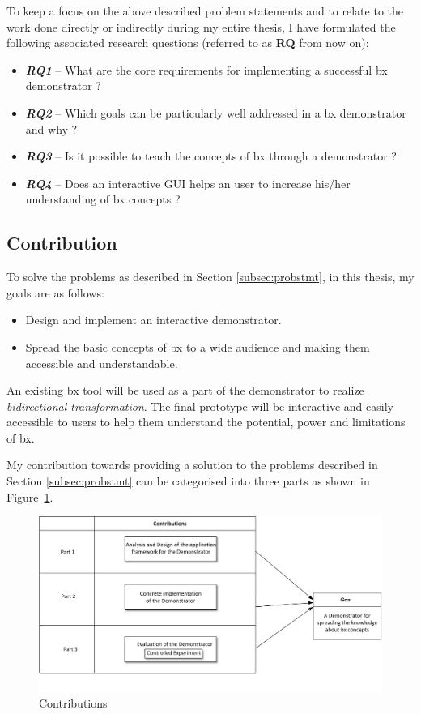 To keep a focus on the above described problem statements and to relate to the work done directly or indirectly during my entire thesis, I have formulated the following associated research questions (referred to as \textbf{RQ} from now on):

\begin{itemize}
	\item {\textbf{\textit{RQ1}} -- What are the core requirements for implementing a successful bx demonstrator ?}
	\item {\textbf{\textit{RQ2}} -- Which goals can be particularly well addressed in a bx demonstrator and why ?}
	\item {\textbf{\textit{RQ3}} -- Is it possible to teach the concepts of bx through a demonstrator ?}
	\item {\textbf{\textit{RQ4}} -- Does an interactive GUI helps an user to increase his/her understanding of bx concepts ?}
\end{itemize}

\subsection{Contribution}\label{subsec:contribution}
To solve the problems as described in Section \ref{subsec:probstmt}, in this thesis, my goals are as follows:
\begin{itemize} 
\item {Design and implement an interactive demonstrator.} 
\item {Spread the basic concepts of bx to a wide audience and making them accessible and understandable.}
\end{itemize}

An existing bx tool will be used as a part of the demonstrator to realize \textit{bidirectional transformation}. The final prototype will be interactive and easily accessible to users to help them understand the potential, power and limitations of bx.

My contribution towards providing a solution to the problems described in Section \ref{subsec:probstmt}  can be categorised into three parts as shown in Figure~\ref{fig:Contribution}. 

\begin{figure}
	\includegraphics[width=1\textwidth]{figures/Contribution}
	\caption{Contributions}
	\label{fig:Contribution}
\end{figure}

